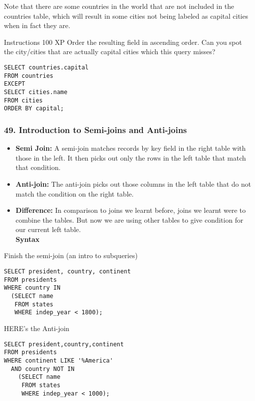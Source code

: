 \documentclass[
]{article}
\providecommand{\tightlist}{%
  \setlength{\itemsep}{0pt}\setlength{\parskip}{0pt}}
\begin{document}
Note that there are some countries in the world that are not included in
the countries table, which will result in some cities not being labeled
as capital cities when in fact they are.

Instructions 100 XP Order the resulting field in ascending order. Can
you spot the city/cities that are actually capital cities which this
query misses?

\begin{verbatim}
SELECT countries.capital
FROM countries
EXCEPT
SELECT cities.name
FROM cities
ORDER BY capital;
\end{verbatim}

\hypertarget{introduction-to-semi-joins-and-anti-joins}{%
\subsubsection{49. Introduction to Semi-joins and
Anti-joins}\label{introduction-to-semi-joins-and-anti-joins}}

\begin{itemize}
\tightlist
\item
  \textbf{Semi Join:} A semi-join matches records by key field in the
  right table with those in the left. It then picks out only the rows in
  the left table that match that condition.\\
\item
  \textbf{Anti-join:} The anti-join picks out those columns in the left
  table that do not match the condition on the right table.\\
\item
  \textbf{Difference:} In comparison to joins we learnt before, joins we
  learnt were to combine the tables. But now we are using other tables
  to give condition for our current left table.\\
  \textbf{Syntax}
\end{itemize}

Finish the semi-join (an intro to subqueries)

\begin{verbatim}
SELECT president, country, continent
FROM presidents
WHERE country IN
  (SELECT name
   FROM states
   WHERE indep_year < 1800);
\end{verbatim}

HERE's the Anti-join

\begin{verbatim}
SELECT president,country,continent
FROM presidents
WHERE continent LIKE '%America'
  AND country NOT IN
    (SELECT name
     FROM states
     WHERE indep_year < 1000);
\end{verbatim}
\end{document}
